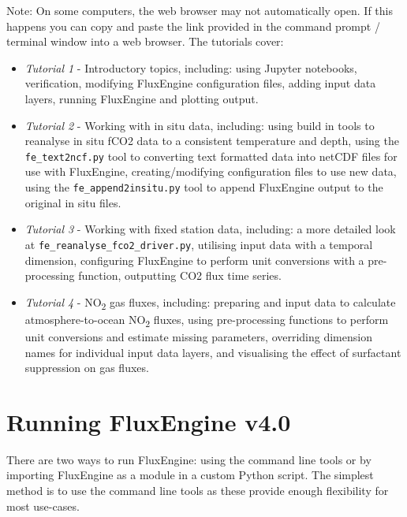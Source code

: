 \documentclass[]{scrartcl}
\begin{document}
Note: On some computers, the web browser may not automatically open. If this happens you can copy and paste the link provided in the command prompt / terminal window into a web browser. The tutorials cover:
\begin{itemize}
	\item \textit{Tutorial 1} - Introductory topics, including: using Jupyter notebooks, verification, modifying FluxEngine configuration files, adding input data layers, running FluxEngine and plotting output.
	\item \textit{Tutorial 2} - Working with in situ data, including: using build in tools to reanalyse in situ fCO2 data to a consistent temperature and depth, using the \texttt{fe\_text2ncf.py} tool to converting text formatted data into netCDF files for use with FluxEngine, creating/modifying configuration files to use new data, using the \texttt{fe\_append2insitu.py} tool to append FluxEngine output to the original in situ files.
	\item \textit{Tutorial 3} - Working with fixed station data, including: a more detailed look at \texttt{fe\_reanalyse\_fco2\_driver.py}, utilising input data with a temporal dimension, configuring FluxEngine to perform unit conversions with a pre-processing function, outputting CO2 flux time series.
	\item \textit{Tutorial 4} - NO\textsubscript{2} gas fluxes, including: preparing and input data to calculate atmosphere-to-ocean NO\textsubscript{2} fluxes, using pre-processing functions to perform unit conversions and estimate missing parameters, overriding dimension names for individual input data layers, and visualising the effect of surfactant suppression on gas fluxes.
\end{itemize}


\section{Running FluxEngine v4.0} \label{running_fluxengine}
There are two ways to run FluxEngine: using the command line tools or by importing FluxEngine as a module in a custom Python script. The simplest method is to use the command line tools as these provide enough flexibility for most use-cases.
\end{document}

